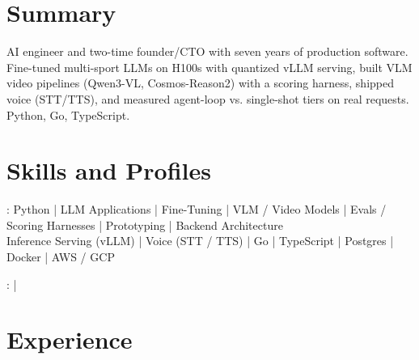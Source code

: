\documentclass[print]{jack-resume}
\begin{document}
\pagecolor{darkmodeBackground}


\begin{minipage}[t][1cm][t]{.03\textwidth}
    \hfill
\end{minipage}

\section{Summary}
AI engineer and two-time founder/CTO with seven years of production software. Fine-tuned multi-sport LLMs on H100s with quantized vLLM serving, built VLM video pipelines (Qwen3-VL, Cosmos-Reason2) with a scoring harness, shipped voice (STT/TTS), and measured agent-loop vs. single-shot tiers on real requests. Python, Go, TypeScript.
\sectionsep

\section{Skills and Profiles}
:
Python \hfill | \hfill
LLM Applications \hfill | \hfill
Fine-Tuning \hfill | \hfill
VLM / Video Models \hfill | \hfill
Evals / Scoring Harnesses \hfill | \hfill
Prototyping \hfill | \hfill
Backend Architecture \\
\hspace{1.0cm} Inference Serving (vLLM) \hfill | \hfill
Voice (STT / TTS) \hfill | \hfill
Go \hfill | \hfill
TypeScript \hfill | \hfill
Postgres \hfill | \hfill
Docker \hfill | \hfill
AWS / GCP \\

\raggedright{
    :
      \href{https://www.linkedin.com/in/jack-sturtevant/}{ \ExternalLink} |
     \href{https://github.com/jacksturt}{ \ExternalLink}}

\section{Experience}
\end{document}
